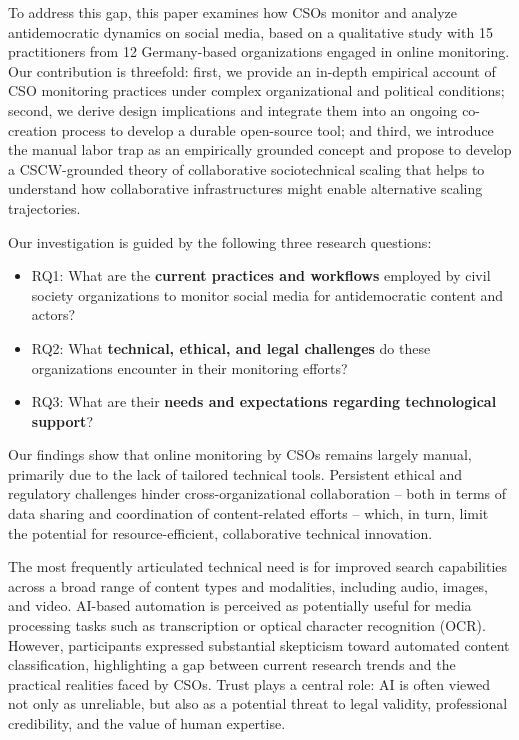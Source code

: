 \documentclass[acmsmall]{acmart}
\begin{document}
To address this gap, this paper examines how CSOs monitor and analyze antidemocratic dynamics on social media, based on a qualitative study with 15 practitioners from 12 Germany-based organizations engaged in online monitoring. Our contribution is threefold: first, we provide an in-depth empirical account of CSO monitoring practices under complex organizational and political conditions; second, we derive design implications and integrate them into an ongoing co-creation process to develop a durable open-source tool; and third, we introduce the manual labor trap as an empirically grounded concept and propose to develop a CSCW-grounded theory of collaborative sociotechnical scaling that helps to understand how collaborative infrastructures might enable alternative scaling trajectories.

Our investigation is guided by the following three research questions:

\begin{itemize}
\item RQ1: What are the \textbf{current practices and workflows} employed by civil society organizations to monitor social media for antidemocratic content and actors?
\item RQ2: What \textbf{technical, ethical, and legal challenges} do these organizations encounter in their monitoring efforts?
\item RQ3: What are their \textbf{needs and expectations regarding technological support}?
\end{itemize}

Our findings show that online monitoring by CSOs remains largely manual, primarily due to the lack of tailored technical tools. Persistent ethical and regulatory challenges hinder cross-organizational collaboration -- both in terms of data sharing and coordination of content-related efforts -- which, in turn, limit the potential for resource-efficient, collaborative technical innovation. 

The most frequently articulated technical need is for improved search capabilities across a broad range of content types and modalities, including audio, images, and video.  AI-based automation is perceived as potentially useful for media processing tasks such as transcription or optical character recognition (OCR). However, participants expressed substantial skepticism toward automated content classification, highlighting a gap between current research trends and the practical realities faced by CSOs. Trust plays a central role: AI is often viewed not only as unreliable, but also as a potential threat to legal validity, professional credibility, and the value of human expertise.
\end{document}
